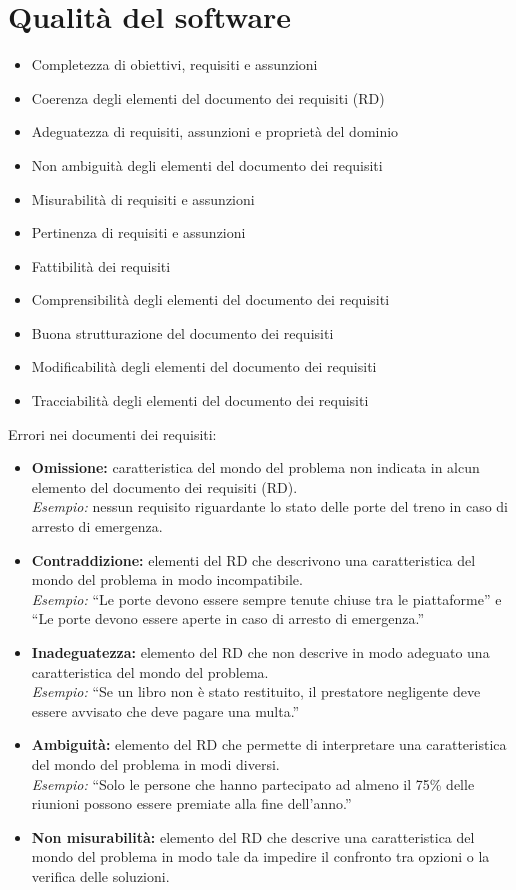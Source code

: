 \documentclass[../main.tex]{subfiles}
\begin{document}
\section{Qualità del software}
\begin{itemize}
    \item Completezza di obiettivi, requisiti e assunzioni
    \item Coerenza degli elementi del documento dei requisiti (RD)
    \item Adeguatezza di requisiti, assunzioni e proprietà del dominio
    \item Non ambiguità degli elementi del documento dei requisiti
    \item Misurabilità di requisiti e assunzioni
    \item Pertinenza di requisiti e assunzioni
    \item Fattibilità dei requisiti
    \item Comprensibilità degli elementi del documento dei requisiti
    \item Buona strutturazione del documento dei requisiti
    \item Modificabilità degli elementi del documento dei requisiti
    \item Tracciabilità degli elementi del documento dei requisiti
\end{itemize}
Errori nei documenti dei requisiti:
\begin{itemize}
    \item \textbf{Omissione:} caratteristica del mondo del problema non indicata in alcun elemento del documento dei requisiti (RD).\\
    \emph{Esempio:} nessun requisito riguardante lo stato delle porte del treno in caso di arresto di emergenza.
    
    \item \textbf{Contraddizione:} elementi del RD che descrivono una caratteristica del mondo del problema in modo incompatibile.\\
    \emph{Esempio:} ``Le porte devono essere sempre tenute chiuse tra le piattaforme'' e ``Le porte devono essere aperte in caso di arresto di emergenza.''
    
    \item \textbf{Inadeguatezza:} elemento del RD che non descrive in modo adeguato una caratteristica del mondo del problema.\\
    \emph{Esempio:} ``Se un libro non è stato restituito, il prestatore negligente deve essere avvisato che deve pagare una multa.''
    
    \item \textbf{Ambiguità:} elemento del RD che permette di interpretare una caratteristica del mondo del problema in modi diversi.\\
    \emph{Esempio:} ``Solo le persone che hanno partecipato ad almeno il 75\% delle riunioni possono essere premiate alla fine dell’anno.''
    
    \item \textbf{Non misurabilità:} elemento del RD che descrive una caratteristica del mondo del problema in modo tale da impedire il confronto tra opzioni o la verifica delle soluzioni.
\end{itemize}
\end{document}
